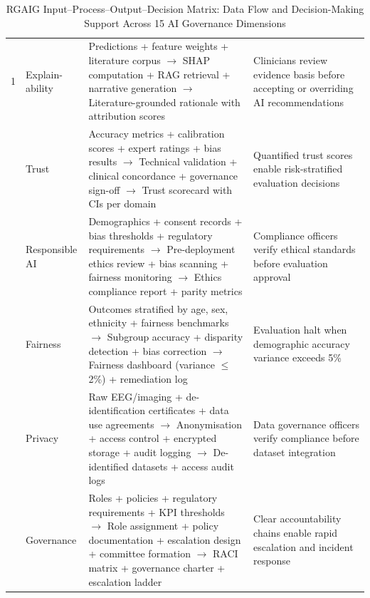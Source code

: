 \iffalse
\begin{table}[!htbp]
\tablestripes
\tablefontsize
\caption[RGAIG Input--Process--Output--Decision Matrix]{RGAIG Input--Process--Output--Decision Matrix: Data Flow and Decision-Making Support Across 15 AI Governance Dimensions}
\begin{tabularx}{\textwidth}{@{} p{0.4cm} p{1.5cm} L L @{}}
\toprule
\thead{\#} &  &  &  \\
 & Explain-ability & Predictions + feature weights + literature corpus $\to$ SHAP computation + RAG retrieval + narrative generation $\to$ Literature-grounded rationale with attribution scores & Clinicians review evidence basis before accepting or overriding AI recommendations \\
 & Trust & Accuracy metrics + calibration scores + expert ratings + bias results $\to$ Technical validation + clinical concordance + governance sign-off $\to$ Trust scorecard with CIs per domain & Quantified trust scores enable risk-stratified evaluation decisions \\
 & Responsible AI & Demographics + consent records + bias thresholds + regulatory requirements $\to$ Pre-deployment ethics review + bias scanning + fairness monitoring $\to$ Ethics compliance report + parity metrics & Compliance officers verify ethical standards before evaluation approval \\
 & Fairness & Outcomes stratified by age, sex, ethnicity + fairness benchmarks $\to$ Subgroup accuracy + disparity detection + bias correction $\to$ Fairness dashboard (variance $\leq$2\%) + remediation log & Evaluation halt when demographic accuracy variance exceeds 5\% \\
 & Privacy & Raw EEG/imaging + de-identification certificates + data use agreements $\to$ Anonymisation + access control + encrypted storage + audit logging $\to$ De-identified datasets + access audit logs & Data governance officers verify compliance before dataset integration \\
 & Governance & Roles + policies + regulatory requirements + KPI thresholds $\to$ Role assignment + policy documentation + escalation design + committee formation $\to$ RACI matrix + governance charter + escalation ladder & Clear accountability chains enable rapid escalation and incident response \\

\end{tabularx}
\end{table}

